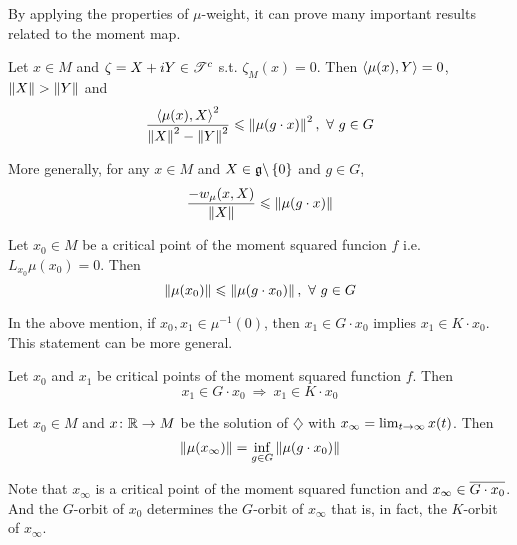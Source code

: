 \documentclass[a4paper,12pt]{article}
\begin{document}
	By applying the properties of $\mu$-weight, it can prove many important results related to the moment map.

	\begin{thm}
		Let $x \in M$ and $\zeta = X+iY \in \mathscr{T}^c$ s.t. $\zeta_M(x) = 0$. Then $\left\langle \mu(x),Y \right\rangle = 0$, $\left\lVert X\right\lVert > \left\lVert Y\right\lVert$ and
		\begin{equation*}
			\frac{\left\langle \mu(x),X \right\rangle^2}{\left\lVert X\right\lVert^2-\left\lVert Y\right\lVert^2} \leqslant \left\lVert\mu(g \cdot x)\right\lVert^2,~\forall~g \in G
		\end{equation*}
	\end{thm}
	\begin{rem}
		More generally, for any $x\in M$ and $X \in \mathfrak{g} \backslash \left\{0\right\}$ and $g \in G$,
		\begin{equation*}
			\frac{-w_{\mu}(x,X)}{\left\lVert X\right\lVert} \leqslant \left\lVert\mu(g \cdot x)\right\lVert
		\end{equation*}
	\end{rem}
	\begin{cor}
		Let $x_0 \in M$ be a critical point of the moment squared funcion $f$ i.e. $L_{x_0}\mu(x_0) = 0$. Then
		\begin{equation*}
			\left\lVert\mu(x_0)\right\lVert \leqslant \left\lVert\mu(g \cdot x_0)\right\lVert,~\forall~ g \in G
		\end{equation*}
	\end{cor}

	In the above mention, if $x_0,x_1 \in \mu^{-1}(0)$, then $x_1 \in G \cdot x_0$ implies $x_1 \in K \cdot x_0$. This statement can be more general.
	\begin{thm}
		Let $x_0$ and $x_1$ be critical points of the moment squared function $f$. Then
		\begin{equation*}
			x_1 \in G \cdot x_0 ~\Rightarrow~ x_1 \in K \cdot x_0
		\end{equation*}
	\end{thm}

	\begin{thm}
		Let $x_0 \in M$ and $x \colon \mathbb{R} \rightarrow M$ be the solution of $\diamondsuit$ with $x_{\infty} = \lim_{t \rightarrow \infty}x(t)$. Then
		\begin{equation*}
		 	\left\lVert\mu(x_{\infty})\right\lVert = \inf_{g \in G} \left\lVert\mu(g \cdot x_0)\right\lVert
		\end{equation*}
	\end{thm}
	\begin{rem}
		Note that $x_{\infty}$ is a critical point of the moment squared function and $x_{\infty} \in \overline{G \cdot x_0}$. And the $G$-orbit of $x_0$ determines the $G$-orbit of $x_{\infty}$ that is, in fact, the $K$-orbit of $x_{\infty}$.
	\end{rem}
\end{document}
